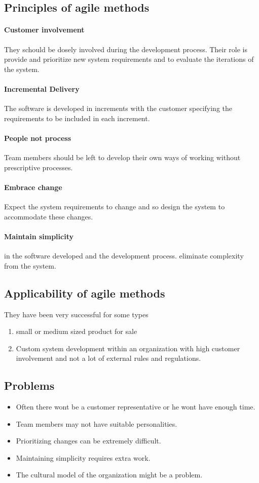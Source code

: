 \documentclass[a4paper,11pt,twocolumn]{report}
\begin{document}
    \subsection{Principles of agile methods}
    \paragraph{Customer involvement}
    They schould be dosely involved during the development process.
    Their role is provide and prioritize new system requirements and to
    evaluate the iterations of the system.
    \paragraph{Incremental Delivery}
    The software is developed in increments with the customer specifying the
    requirements to be included in each increment.
    \paragraph{People not process}
    Team members should be left to develop their own ways of working without
    prescriptive processes.
    \paragraph{Embrace change}
    Expect the system requirements to change and so design the system to
    accommodate these changes.
    \paragraph{Maintain simplicity}
    in the software developed and the development process. eliminate complexity
    from the system.
    \subsection{Applicability of agile methods}
    They have been very successful for some types
    \begin{enumerate}
        \item small or medium sized product for sale
        \item Custom system development within an organization with high
            customer involvement and not a lot of external rules and 
            regulations.
    \end{enumerate}
    \subsection{Problems}
    \begin{itemize}
        \item Often there wont be a customer representative or he wont have
            enough time.
        \item Team members may not have suitable personalities.
        \item Prioritizing changes can be extremely difficult.
        \item Maintaining simplicity requires extra work.
        \item The cultural model of the organization might be a problem.
    \end{itemize}
\end{document}
